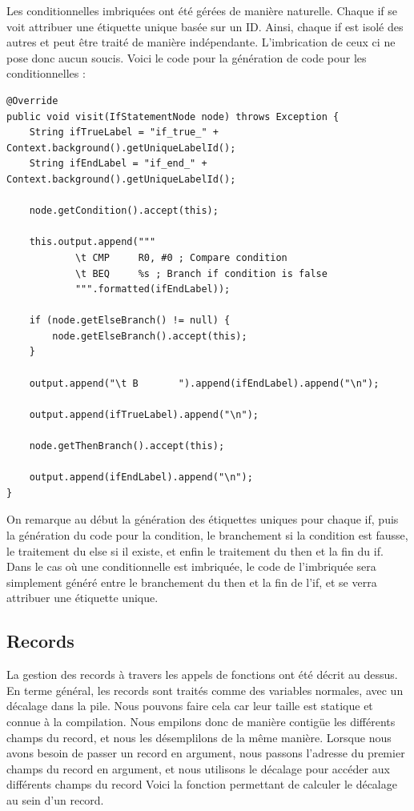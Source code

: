 \documentclass[french,a4paper]{article}
\begin{document}
    Les conditionnelles imbriquées ont été gérées de manière naturelle. Chaque if se voit attribuer une étiquette unique basée sur un ID. Ainsi, chaque if est isolé des autres et peut être traité de manière indépendante. L'imbrication de ceux ci ne pose donc aucun soucis. Voici le code pour la génération de code pour les conditionnelles :

    \begin{lstlisting}
@Override
public void visit(IfStatementNode node) throws Exception {
    String ifTrueLabel = "if_true_" + Context.background().getUniqueLabelId();
    String ifEndLabel = "if_end_" + Context.background().getUniqueLabelId();

    node.getCondition().accept(this);

    this.output.append("""
            \t CMP     R0, #0 ; Compare condition
            \t BEQ     %s ; Branch if condition is false
            """.formatted(ifEndLabel));

    if (node.getElseBranch() != null) {
        node.getElseBranch().accept(this);
    }

    output.append("\t B       ").append(ifEndLabel).append("\n");

    output.append(ifTrueLabel).append("\n");

    node.getThenBranch().accept(this);

    output.append(ifEndLabel).append("\n");
}
    \end{lstlisting}

    On remarque au début la génération des étiquettes uniques pour chaque if, puis la génération du code pour la condition, le branchement si la condition est fausse, le traitement du else si il existe, et enfin le traitement du then et la fin du if. Dans le cas où une conditionnelle est imbriquée, le code de l'imbriquée sera simplement généré entre le branchement du then et la fin de l'if, et se verra attribuer une étiquette unique.

    \subsection{Records}

    La gestion des records à travers les appels de fonctions ont été décrit au dessus. En terme général, les records sont traités comme des variables normales, avec un décalage dans la pile. Nous pouvons faire cela car leur taille est statique et connue à la compilation. Nous empilons donc de manière contigüe les différents champs du record, et nous les désemplilons de la même manière. Lorsque nous avons besoin de passer un record en argument, nous passons l'adresse du premier champs du record en argument, et nous utilisons le décalage pour accéder aux différents champs du record Voici la fonction permettant de calculer le décalage au sein d'un record. \\
\end{document}
